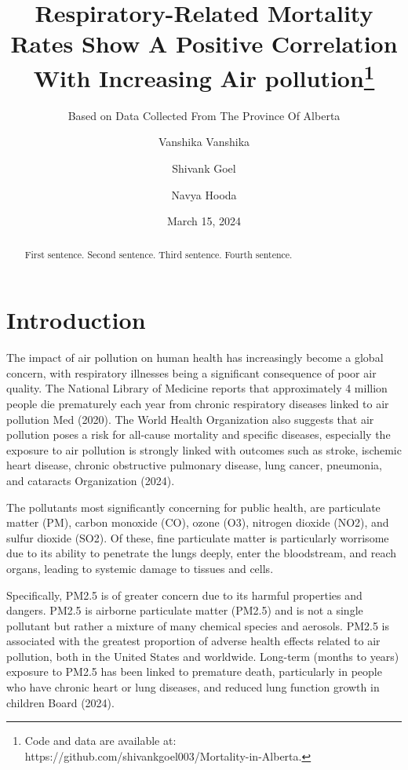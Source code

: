 \documentclass[
  letterpaper,
  DIV=11,
  numbers=noendperiod]{scrartcl}
\title{Respiratory-Related Mortality Rates Show A Positive Correlation
With Increasing Air pollution\thanks{Code and data are available at:
https://github.com/shivankgoel003/Mortality-in-Alberta.}}
\subtitle{Based on Data Collected From The Province Of Alberta}
\author{Vanshika Vanshika \and Shivank Goel \and Navya Hooda}
\date{March 15, 2024}
\begin{document}
\maketitle
\begin{abstract}
First sentence. Second sentence. Third sentence. Fourth sentence.
\end{abstract}

\section{Introduction}\label{introduction}

The impact of air pollution on human health has increasingly become a
global concern, with respiratory illnesses being a significant
consequence of poor air quality. The National Library of Medicine
reports that approximately 4 million people die prematurely each year
from chronic respiratory diseases linked to air pollution Med (2020).
The World Health Organization also suggests that air pollution poses a
risk for all-cause mortality and specific diseases, especially the
exposure to air pollution is strongly linked with outcomes such as
stroke, ischemic heart disease, chronic obstructive pulmonary disease,
lung cancer, pneumonia, and cataracts Organization (2024).

The pollutants most significantly concerning for public health, are
particulate matter (PM), carbon monoxide (CO), ozone (O3), nitrogen
dioxide (NO2), and sulfur dioxide (SO2). Of these, fine particulate
matter is particularly worrisome due to its ability to penetrate the
lungs deeply, enter the bloodstream, and reach organs, leading to
systemic damage to tissues and cells.

Specifically, PM2.5 is of greater concern due to its harmful properties
and dangers. PM2.5 is airborne particulate matter (PM2.5) and is not a
single pollutant but rather a mixture of many chemical species and
aerosols. PM2.5 is associated with the greatest proportion of adverse
health effects related to air pollution, both in the United States and
worldwide. Long-term (months to years) exposure to PM2.5 has been linked
to premature death, particularly in people who have chronic heart or
lung diseases, and reduced lung function growth in children Board
(2024).
\end{document}
